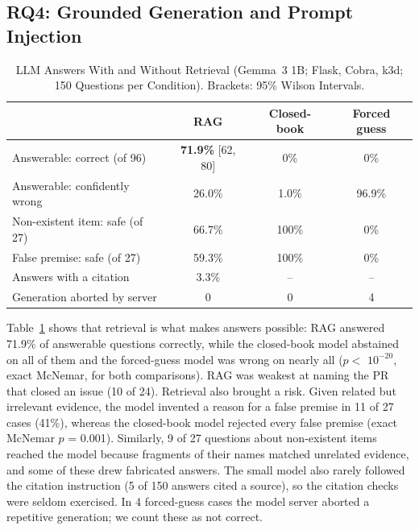 \documentclass[conference]{IEEEtran}
\newcommand{\res}[1]{#1}
\begin{document}
\subsection{RQ4: Grounded Generation and Prompt Injection}
\begin{table}[t]
\caption{LLM Answers With and Without Retrieval (Gemma~3 1B; Flask, Cobra, k3d; 150 Questions per Condition). Brackets: 95\% Wilson Intervals.}
\label{tab:llm}
\centering
\scriptsize
\setlength{\tabcolsep}{2.5pt}
\begin{tabular}{lccc}
\toprule
& RAG & Closed-book & Forced guess \\
\midrule
Answerable: correct (of \res{96}) & \textbf{\res{71.9\%}} [\res{62, 80}] & \res{0\%} & \res{0\%} \\
Answerable: confidently wrong & \res{26.0\%} & \res{1.0\%} & \res{96.9\%} \\
Non-existent item: safe (of \res{27}) & \res{66.7\%} & \res{100\%} & \res{0\%} \\
False premise: safe (of \res{27}) & \res{59.3\%} & \res{100\%} & \res{0\%} \\
Answers with a citation & \res{3.3\%} & -- & -- \\
Generation aborted by server & \res{0} & \res{0} & \res{4} \\
\bottomrule
\end{tabular}
\end{table}

Table~\ref{tab:llm} shows that retrieval is what makes answers possible: RAG answered \res{71.9\%} of answerable questions correctly, while the closed-book model abstained on all of them and the forced-guess model was wrong on nearly all ($p <$ \res{$10^{-20}$}, exact McNemar, for both comparisons). RAG was weakest at naming the PR that closed an issue (\res{10} of \res{24}). Retrieval also brought a risk. Given related but irrelevant evidence, the model invented a reason for a false premise in \res{11} of \res{27} cases (\res{41\%}), whereas the closed-book model rejected every false premise (exact McNemar $p$ = \res{0.001}). Similarly, \res{9} of \res{27} questions about non-existent items reached the model because fragments of their names matched unrelated evidence, and some of these drew fabricated answers. The small model also rarely followed the citation instruction (\res{5} of \res{150} answers cited a source), so the citation checks were seldom exercised. In \res{4} forced-guess cases the model server aborted a repetitive generation; we count these as not correct.
\end{document}
